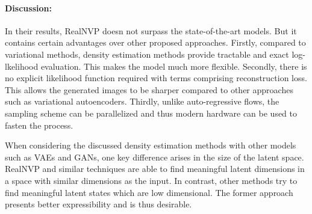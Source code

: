 \documentclass[runningheads]{llncs}
\begin{document}
\paragraph{Discussion:}
In their results, RealNVP doesn not surpass the state-of-the-art models. But it contains certain advantages over other proposed approaches. Firstly, compared to variational methods, density estimation methods provide tractable and exact log-lkelihood evaluation. This makes the model much more flexible. Secondly, there is no explicit likelihood function required with terms comprising reconstruction loss. This allows the generated images to be sharper compared to other approaches such as variational autoencoders. Thirdly, unlike auto-regressive flows, the sampling scheme can be parallelized and thus modern hardware can be used to fasten the process.

When considering the discussed density estimation methods with other models such as VAEs and GANs, one key difference arises in the size of the latent space. RealNVP and similar techniques are able to find meaningful latent dimensions in a space with similar dimensions as the input. In contrast, other methods try to find meaningful latent states which are low dimensional. The former approach presents better expressibility and is thus desirable. 
\end{document}
